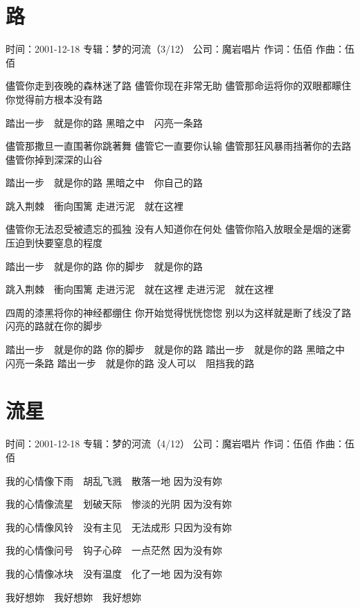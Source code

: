 \documentclass[UTF8,a4paper,oneside,twocolumn,12pt]{ctexbook}
\newcommand{\infopair}[2]{\textbullet #1：#2}
\newcommand{\zc}[1][伍佰]{\infopair{作词}{#1}}
\newcommand{\zq}[1][伍佰]{\infopair{作曲}{#1}}
\newcommand{\zj}[1]{\infopair{专辑}{#1}}
\newcommand{\sj}[1]{\infopair{时间}{#1}}
\newcommand{\gs}[1]{\infopair{公司}{#1}}
\newenvironment{info}{\begin{flushleft}\kaishu
	}
	{\end{flushleft}\normalsize\yahei\par}
\newenvironment{lyric}{
	}
{}
\begin{document}
\section{路}
\begin{info}
	\sj{2001-12-18}
	\zj{梦的河流（3/12）}
	\gs{魔岩唱片}
	\zc
	\zq
\end{info}
\begin{lyric}
	儘管你走到夜晚的森林迷了路
	儘管你现在非常无助
	儘管那命运将你的双眼都矇住
	你觉得前方根本没有路

	踏出一步　就是你的路
	黑暗之中　闪亮一条路

	儘管那撒旦一直围著你跳著舞
	儘管它一直要你认输
	儘管那狂风暴雨挡著你的去路
	儘管你掉到深深的山谷

	踏出一步　就是你的路
	黑暗之中　你自己的路

	跳入荆棘　衝向围篱
	走进污泥　就在这裡

	儘管你无法忍受被遗忘的孤独
	没有人知道你在何处
	儘管你陷入放眼全是烟的迷雾
	压迫到快要窒息的程度

	踏出一步　就是你的路
	你的脚步　就是你的路

	跳入荆棘　衝向围篱
	走进污泥　就在这裡
	走进污泥　就在这裡

	四周的漆黑将你的神经都绷住
	你开始觉得恍恍惚惚
	别以为这样就是断了线没了路
	闪亮的路就在你的脚步

	踏出一步　就是你的路
	你的脚步　就是你的路
	踏出一步　就是你的路
	黑暗之中　闪亮一条路
	踏出一步　就是你的路
	没人可以　阻挡我的路
\end{lyric}

\section{流星}
\begin{info}
	\sj{2001-12-18}
	\zj{梦的河流（4/12）}
	\gs{魔岩唱片}
	\zc
	\zq
\end{info}
\begin{lyric}
	我的心情像下雨　胡乱飞溅　散落一地
	因为没有妳

	我的心情像流星　划破天际　惨淡的光阴
	因为没有妳

	我的心情像风铃　没有主见　无法成形
	只因为没有妳

	我的心情像问号　钩子心碎　一点茫然
	因为没有妳

	我的心情像冰块　没有温度　化了一地
	因为没有妳

	我好想妳　我好想妳　我好想妳
\end{lyric}
\end{document}
